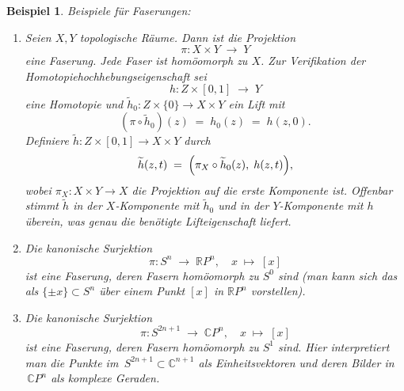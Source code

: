 \documentclass[12pt]{article}
\numberwithin{conj}{section}
\newtheorem{example}[conj]{Beispiel}
\begin{document}
    \begin{example}
        \label{examplesFibrations} Beispiele für Faserungen:
        \begin{enumerate}[nolistsep]
            \item Seien $X,Y$ topologische Räume. Dann ist die Projektion
                \[
                    \pi : X \times Y \;\longrightarrow\; Y
                \]
                eine Faserung. Jede Faser ist homöomorph zu $X$. Zur Verifikation der
                Homotopiehochhebungseigenschaft sei
                \[
                    h : Z \times [0,1] \;\longrightarrow\; Y
                \]
                eine Homotopie und $\widetilde{h}_{0} : Z \times \{0\} \to X \times Y$
                ein Lift mit
                \[
                    (\pi \circ \widetilde{h}_{0})(z) \;=\; h_{0}(z) \;=\; h(z,0).
                \]
                Definiere $\widetilde{h}: Z \times [0,1] \to X \times Y$ durch
                \[
                    \widetilde{h}(z,t) \;=\; \Bigl( \pi_{X} \circ \widetilde{h}_{0} (
                    z),\; h(z,t)\Bigr),
                \]
                wobei $\pi_{X} : X \times Y \to X$ die Projektion auf die erste Komponente
                ist. Offenbar stimmt $\widetilde{h}$ in der $X$-Komponente mit $\widetilde{h}
                _{0}$ und in der $Y$-Komponente mit $h$ überein, was genau die benötigte
                Lifteigenschaft liefert.

            \item Die kanonische Surjektion
                \[
                    \pi : S^{n} \;\longrightarrow\; \mathbb{R}P^{n},\quad x \;\mapsto\; [x]
                \]
                ist eine Faserung, deren Fasern homöomorph zu $S^{0}$ sind (man kann sich
                das als $\{\pm x\}\subset S^{n}$ über einem Punkt $[x]$ in $\mathbb{R}P^{n}$
                vorstellen).

            \item Die kanonische Surjektion
                \[
                    \pi : S^{2n+1}\;\longrightarrow\; \mathbb{C}P^{n},\quad x \;\mapsto\; [
                    x]
                \]
                ist eine Faserung, deren Fasern homöomorph zu $S^{1}$ sind. Hier interpretiert
                man die Punkte im $\,S^{2n+1}\subset \mathbb{C}^{n+1}$ als Einheitsvektoren
                und deren Bilder in $\,\mathbb{C}P^{n}$ als komplexe Geraden.
        \end{enumerate}
    \end{example}
\end{document}
